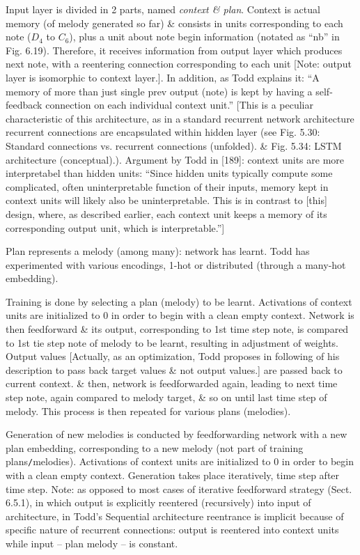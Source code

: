 \documentclass{article}
\begin{document}
\begin{itemize}
\begin{itemize}
\begin{itemize}
			Input layer is divided in 2 parts, named {\it context \& plan}. Context is actual memory (of melody generated so far) \& consists in units corresponding to each note ($D_4$ to $C_6$), plus a unit about note begin information (notated as ``nb'' in {\sf Fig. 6.19}). Therefore, it receives information from output layer which produces next note, with a reentering connection corresponding to each unit [Note: output layer is isomorphic to context layer.]. In addition, as {\sc Todd} explains it: ``A memory of more than just single prev output (note) is kept by having a self-feedback connection on each individual context unit.'' [This is a peculiar characteristic of this architecture, as in a standard recurrent network architecture recurrent connections are encapsulated within hidden layer (see {\sf Fig. 5.30: Standard connections vs. recurrent connections (unfolded).} \& {\sf Fig. 5.34: LSTM architecture (conceptual).}). Argument by {\sc Todd} in [189]: context units are more interpretabel than hidden units: ``Since hidden units typically compute some complicated, often uninterpretable function of their inputs, memory kept in context units will likely also be uninterpretable. This is in contrast to [this] design, where, as described earlier, each context unit keeps a memory of its corresponding output unit, which is interpretable.'']

			Plan represents a melody (among many): network has learnt. {\sc Todd} has experimented with various encodings, 1-hot or distributed (through a many-hot embedding).

			Training is done by selecting a plan (melody) to be learnt. Activations of context units are initialized to 0 in order to begin with a clean empty context. Network is then feedforward \& its output, corresponding to 1st time step note, is compared to 1st tie step note of melody to be learnt, resulting in adjustment of weights. Output values [Actually, as an optimization, {\sc Todd} proposes in following of his description to pass back target values \& not output values.] are passed back to current context. \& then, network is feedforwarded again, leading to next time step note, again compared to melody target, \& so on until last time step of melody. This process is then repeated for various plans (melodies).

			Generation of new melodies is conducted by feedforwarding network with a new plan embedding, corresponding to a new melody (not part of training plans{\tt/}melodies). Activations of context units are initialized to 0 in order to begin with a clean empty context. Generation takes place iteratively, time step after time step. Note: as opposed to most cases of iterative feedforward strategy (Sect. 6.5.1), in which output is explicitly reentered (recursively) into input of architecture, in {\sc Todd}'s Sequential architecture reentrance is implicit because of specific nature of recurrent connections: output is reentered into context units while input -- plan melody -- is constant.


\end{itemize}
\end{itemize}
\end{itemize}
\end{document}
